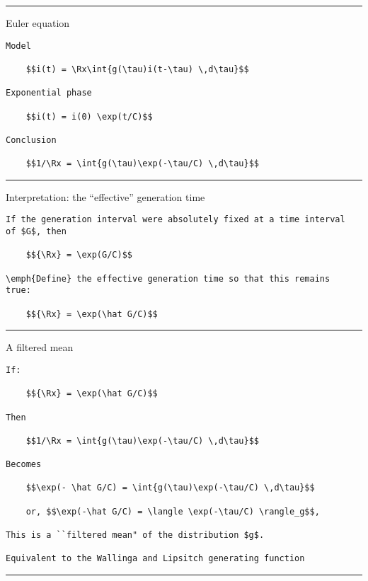 \begin{center}\rule{0.5\linewidth}{\linethickness}\end{center}

Euler equation

\begin{verbatim}
Model

    $$i(t) = \Rx\int{g(\tau)i(t-\tau) \,d\tau}$$

Exponential phase

    $$i(t) = i(0) \exp(t/C)$$

Conclusion

    $$1/\Rx = \int{g(\tau)\exp(-\tau/C) \,d\tau}$$
\end{verbatim}

\begin{center}\rule{0.5\linewidth}{\linethickness}\end{center}

Interpretation: the ``effective'' generation time

\begin{verbatim}
If the generation interval were absolutely fixed at a time interval
of $G$, then 

    $${\Rx} = \exp(G/C)$$

\emph{Define} the effective generation time so that this remains
true:

    $${\Rx} = \exp(\hat G/C)$$
\end{verbatim}

\begin{center}\rule{0.5\linewidth}{\linethickness}\end{center}

A filtered mean

\begin{verbatim}
If:

    $${\Rx} = \exp(\hat G/C)$$

Then

    $$1/\Rx = \int{g(\tau)\exp(-\tau/C) \,d\tau}$$

Becomes

    $$\exp(- \hat G/C) = \int{g(\tau)\exp(-\tau/C) \,d\tau}$$
    
    or, $$\exp(-\hat G/C) = \langle \exp(-\tau/C) \rangle_g$$,

This is a ``filtered mean" of the distribution $g$.

Equivalent to the Wallinga and Lipsitch generating function
\end{verbatim}

\begin{center}\rule{0.5\linewidth}{\linethickness}\end{center}

